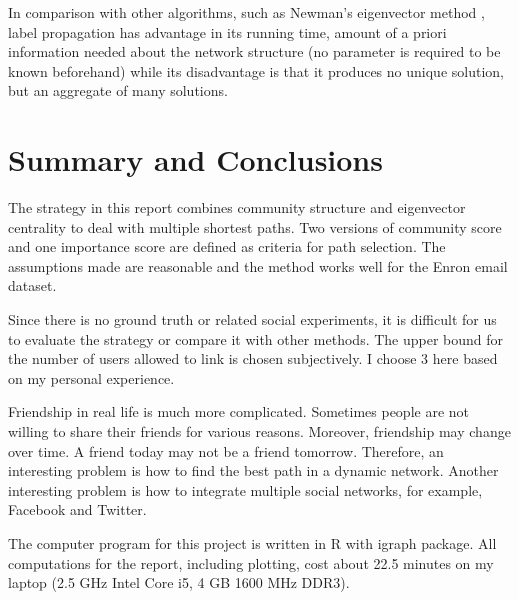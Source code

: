 \documentclass[journal]{IEEEtran}
\begin{document}
In comparison with other algorithms, such as Newman's eigenvector method \cite{citeulike:646478}, label propagation has advantage in its running time, amount of a priori information needed about the network structure (no parameter is required to be known beforehand) while its disadvantage is that it produces no unique solution, but an aggregate of many solutions.

\section{Summary and Conclusions}
The strategy in this report combines community structure and eigenvector centrality to deal with multiple shortest paths. Two versions of community score and one importance score are defined as criteria for path selection. The assumptions made are reasonable and the method works well for the Enron email dataset. 

Since there is no ground truth or related social experiments, it is difficult for us to evaluate the strategy or compare it with other methods. The upper bound for the number of users allowed to link is chosen subjectively. I choose 3 here based on my personal experience.

Friendship in real life is much more complicated. Sometimes people are not willing to share their friends for various reasons. Moreover, friendship may change over time. A friend today may not be a friend tomorrow. Therefore, an interesting problem is how to find the best path in a dynamic network. Another interesting problem is how to integrate multiple social networks, for example, Facebook and Twitter.

The computer program for this project is written in R with igraph package. All computations for the report, including plotting, cost about 22.5 minutes on my laptop (2.5 GHz Intel Core i5, 4 GB 1600 MHz DDR3).







\ifCLASSOPTIONcaptionsoff
  \newpage
\fi




\nocite{*}


\end{document}

